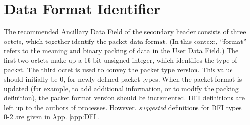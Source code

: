 \documentclass[12pt]{article}
\begin{document}
\section{Data Format Identifier}
\label{sec:DFI}
\par The recommended Ancillary Data Field of the secondary header consists of three octets, which together identify the packet data format. (In this context, ``format'' refers to the meaning and binary packing of data in the User Data Field.) The first two octets make up a 16-bit unsigned integer, which identifies the type of packet. The third octet is used to convey the packet type version. This value should initially be 0, for newly-defined packet types. When the packet format is updated (for example, to add additional information, or to modify the packing definition), the packet format version should be incremented. DFI definitions are left up to the authors of processes. However, \textit{suggested} definitions for DFI types 0-2 are given in App. \ref{app:DFI}.

\newpage
\appendix
\end{document}
